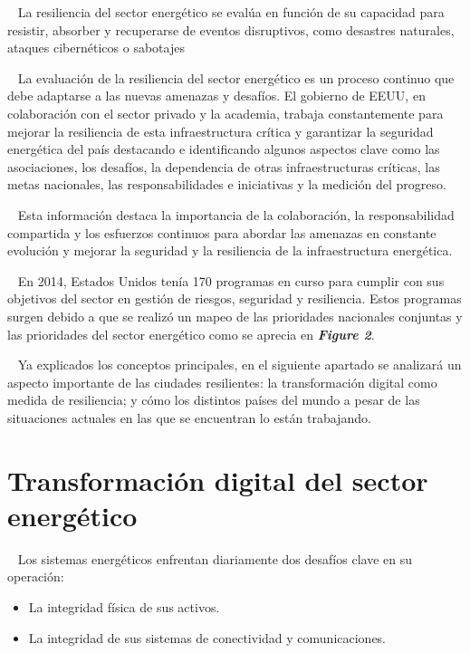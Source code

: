\documentclass{article}
\providecommand{\tightlist}{%
  \setlength{\itemsep}{0pt}\setlength{\parskip}{0pt}}
\begin{document}
~ La resiliencia del sector energético se evalúa en función de su
capacidad para resistir, absorber y recuperarse de eventos disruptivos,
como desastres naturales, ataques cibernéticos o sabotajes

~ La evaluación de la resiliencia del sector energético es un proceso
continuo que debe adaptarse a las nuevas amenazas y desafíos. El
gobierno de EEUU, en colaboración con el sector privado y la academia,
trabaja constantemente para mejorar la resiliencia de esta
infraestructura crítica y garantizar la seguridad energética del país
destacando e identificando algunos aspectos clave como las asociaciones,
los desafíos, la dependencia de otras infraestructuras críticas, las
metas nacionales, las responsabilidades e iniciativas y la medición del
progreso.

~ Esta información destaca la importancia de la colaboración, la
responsabilidad compartida y los esfuerzos continuos para abordar las
amenazas en constante evolución y mejorar la seguridad y la resiliencia
de la infraestructura energética.

~ En 2014, Estados Unidos tenía 170 programas en curso para cumplir con
sus objetivos del sector en gestión de riesgos, seguridad y resiliencia.
Estos programas surgen debido a que se realizó un mapeo de las
prioridades nacionales conjuntas y las prioridades del sector energético
como se aprecia en \textbf{\emph{Figure 2}}.

~ Ya explicados los conceptos principales, en el siguiente apartado se
analizará un aspecto importante de las ciudades resilientes: la
transformación digital como medida de resiliencia; y cómo los distintos
países del mundo a pesar de las situaciones actuales en las que se
encuentran lo están trabajando.

\hypertarget{transformaciuxf3n-digital-del-sector-energuxe9tico}{%
\section{Transformación digital del sector
energético}\label{transformaciuxf3n-digital-del-sector-energuxe9tico}}

~ Los sistemas energéticos enfrentan diariamente dos desafíos clave en
su operación:

\begin{itemize}
\tightlist
\item
  La integridad física de sus activos.
\item
  La integridad de sus sistemas de conectividad y comunicaciones.
\end{itemize}
\end{document}

